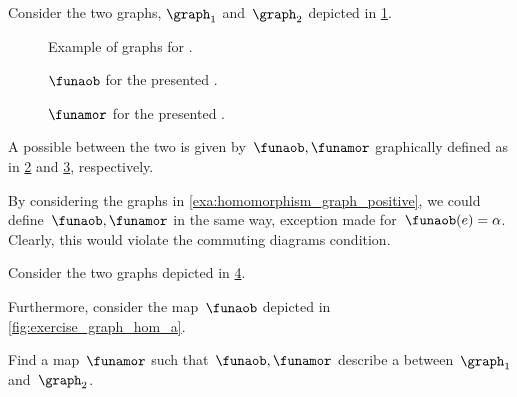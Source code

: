 \begin{example}
    \label{exa:homomorphism_graph_positive}
    Consider the two graphs, $\graph_1$ and~$\graph_2$ depicted in \cref{fig:ex_graph_homom}.
    \begin{figure}[h]
        \centering
        \caption{Example of graphs for .}
        \label{fig:ex_graph_homom}
    \end{figure}

    \begin{figure}[h]
        \centering
        \caption{$\funaob$ for the presented .}
        \label{fig:graph_homo_a}
    \end{figure}

    \begin{figure}[h]
        \centering
        \caption{$\funamor$ for the presented .}
        \label{fig:graph_homo_b}
    \end{figure}

    A possible  between the two is given by~$\funaob,\funamor$ graphically defined as in \cref{fig:graph_homo_a} and \cref{fig:graph_homo_b}, respectively.
\end{example}

\begin{example}[Counterexample]
    By considering the graphs in \cref{exa:homomorphism_graph_positive}, we could define~$\funaob,\funamor$ in the same way, exception made for~$\funaob(e)=\alpha$.
    Clearly, this would violate the commuting diagrams condition.
\end{example}

\begin{exercise}
    Consider the two graphs depicted in \cref{fig:ex_graph_hom}.
    \begin{figure}[h]
        \centering
        \caption{}
        \label{fig:ex_graph_hom}
    \end{figure}
    \begin{marginfigure}
        \centering
        \caption{}
        \label{fig:exercise_graph_hom_a}
    \end{marginfigure}
    Furthermore, consider the map~$\funaob$ depicted in \cref{fig:exercise_graph_hom_a}.

    Find a map~$\funamor$ such that~$\funaob,\funamor$ describe a  between~$\graph_1$ and~$\graph_2$.
\end{exercise}

